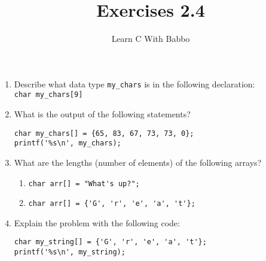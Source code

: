 \documentclass{article}
\begin{document}
\title{Exercises 2.4}
\author{Learn C With Babbo}
\date{}
\maketitle
\begin{enumerate}
\item Describe what data type \verb|my_chars| is in the following declaration: \\
\verb|char my_chars[9]|
\item What is the output of the following statements?
\begin{lstlisting}[style=CStyle]
char my_chars[] = {65, 83, 67, 73, 73, 0};
printf('%s\n', my_chars);
\end{lstlisting}
\item What are the lengths (number of elements) of the following arrays?
\begin{enumerate}
\item \verb|char arr[] = "What's up?";|
\item \verb|char arr[] = {'G', 'r', 'e', 'a', 't'};|
\end{enumerate}
\item Explain the problem with the following code:
\begin{lstlisting}[style=CStyle]
char my_string[] = {'G', 'r', 'e', 'a', 't'};
printf('%s\n', my_string);
\end{lstlisting}
\end{enumerate}
\end{document}
